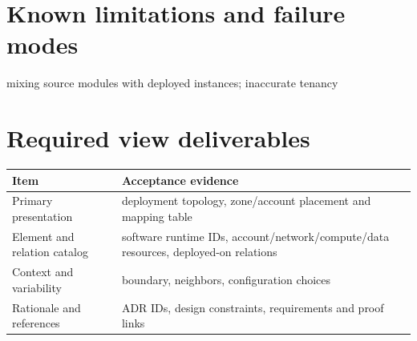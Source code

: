 \documentclass[10pt,letterpaper]{article}
\begin{document}
\section{Known limitations and failure modes}
mixing source modules with deployed instances; inaccurate tenancy

\section{Required view deliverables}
\small
\begin{tabularx}{\linewidth}{@{}YY@{}}
\toprule
\textbf{Item} & \textbf{Acceptance evidence} \\
\midrule
Primary presentation & deployment topology, zone/account placement and mapping table \\
Element and relation catalog & software runtime IDs, account/network/compute/data resources, deployed-on relations \\
Context and variability & boundary, neighbors, configuration choices \\
Rationale and references & ADR IDs, design constraints, requirements and proof links \\
\bottomrule
\end{tabularx}
\normalsize
\end{document}
